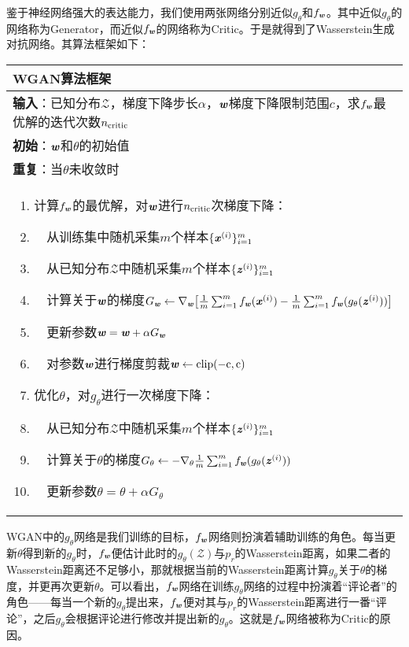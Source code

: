 鉴于神经网络强大的表达能力，我们使用两张网络分别近似$g_{\theta}$和$f_{\boldsymbol{\mathit{w}}}$。其中近似$g_{\theta}$的网络称为Generator，而近似$f_{\boldsymbol{\mathit{w}}}$的网络称为Critic。于是就得到了Wasserstein生成对抗网络。其算法框架如下：
\begin{center}
\begin{tabularx}{\textwidth}{X}
\toprule 
\textbf{{WGAN}算法框架}\\
\midrule
\textbf{输入}：已知分布$\mathcal{Z}$，梯度下降步长$\alpha$，$\boldsymbol{\mathit{w}}$梯度下降限制范围$c$，求$f_{\boldsymbol{\mathit{w}}}$最优解的迭代次数$n_{\rm{critic}}$\\
\textbf{初始}：$\boldsymbol{\mathit{w}}$和$\theta$的初始值\\
\textbf{重复}：当$\theta$未收敛时\\
\parbox{1\textwidth}{\begin{enumerate}[topsep=0pt]
    \setlength{\itemsep}{0pt}
    \setlength{\parsep}{0pt}
    \setlength{\parskip}{0pt}
    \item 计算$f_{\boldsymbol{\mathit{w}}}$的最优解，对$\boldsymbol{\mathit{w}}$进行$n_{\rm{critic}}$次梯度下降：
    \item $\quad$从训练集中随机采集$m$个样本$\{\boldsymbol{\mathit{x}}^{(i)}\}_{i=1}^{m}$
    \item $\quad$从已知分布$\mathcal{Z}$中随机采集$m$个样本$\{\boldsymbol{\mathit{z}}^{(i)}\}_{i=1}^{m}$
    \item $\quad$计算关于$\boldsymbol{\mathit{w}}$的梯度$G_{\boldsymbol{\mathit{w}}}\gets\nabla_{\boldsymbol{\mathit{w}}}\big{[} \frac{1}{m}\sum_{i=1}^{m}f_{\boldsymbol{\mathit{w}}}(\boldsymbol{\mathit{x}}^{(i)})-\frac{1}{m}\sum_{i=1}^{m}f_{\boldsymbol{\mathit{w}}}(g_{\theta}(\boldsymbol{\mathit{z}}^{(i)})) \big{]}$
    \item $\quad$更新参数$\boldsymbol{\mathit{w}}=\boldsymbol{\mathit{w}} + \alpha G_{\boldsymbol{\mathit{w}}}$
    \item $\quad$对参数$\boldsymbol{\mathit{w}}$进行梯度剪裁$\boldsymbol{\mathit{w}}\gets\rm{clip}(-c,c)$
    \item 优化$\theta$，对$g_{\theta}$进行一次梯度下降：
    \item $\quad$从已知分布$\mathcal{Z}$中随机采集$m$个样本$\{\boldsymbol{\mathit{z}}^{(i)}\}_{i=1}^{m}$
    \item $\quad$计算关于$\theta$的梯度$G_{\theta}\gets-\nabla_{\theta}\frac{1}{m}\sum_{i=1}^{m}f_{\boldsymbol{\mathit{w}}}(g_{\theta}(\boldsymbol{\mathit{z}}^{(i)}))$
    \item $\quad$更新参数$\theta=\theta + \alpha G_{\theta}$
\end{enumerate}}\\\bottomrule
\end{tabularx}
\end{center}

WGAN中的$g_{\theta}$网络是我们训练的目标，$f_{\boldsymbol{\mathit{w}}}$网络则扮演着辅助训练的角色。每当更新$\theta$得到新的$g_{\theta}$时，$f_{\boldsymbol{\mathit{w}}}$便估计此时的$g_{\theta}(\mathcal{Z})$与$p_{r}$的Wasserstein距离，如果二者的Wasserstein距离还不足够小，那就根据当前的Wasserstein距离计算$g_{\theta}$关于$\theta$的梯度，并更再次更新$\theta$。可以看出，$f_{\boldsymbol{\mathit{w}}}$网络在训练$g_{\theta}$网络的过程中扮演着“评论者”的角色——每当一个新的$g_{\theta}$提出来，$f_{\boldsymbol{\mathit{w}}}$便对其与$p_{r}$的Wasserstein距离进行一番“评论”，之后$g_{\theta}$会根据评论进行修改并提出新的$g_{\theta}$。这就是$f_{\boldsymbol{\mathit{w}}}$网络被称为Critic的原因。

